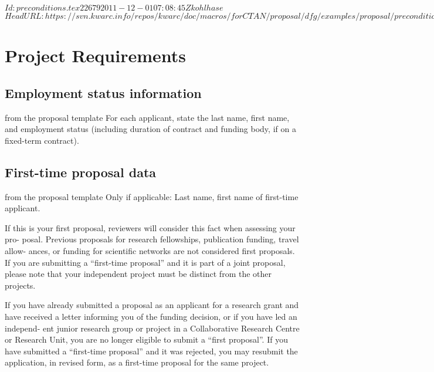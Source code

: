 \svnInfo $Id: preconditions.tex 22679 2011-12-01 07:08:45Z kohlhase $
\svnKeyword $HeadURL: https://svn.kwarc.info/repos/kwarc/doc/macros/forCTAN/proposal/dfg/examples/proposal/preconditions.tex $
\section{Project Requirements }

\subsection{Employment status information }

\begin{todo}{from the proposal template}
  For each applicant, state the last name, first name, and employment status (including
  duration of contract and funding body, if on a fixed-term contract).
\end{todo}

\subsection{First-time proposal data }

\begin{todo}{from the proposal template}
  Only if applicable: Last name, first name of first-time applicant.

  If this is your first proposal, reviewers will consider this fact when assessing your
  pro- posal. Previous proposals for research fellowships, publication funding, travel
  allow- ances, or funding for scientific networks are not considered first proposals. If
  you are submitting a “first-time proposal” and it is part of a joint proposal, please
  note that your independent project must be distinct from the other projects.

  If you have already submitted a proposal as an applicant for a research grant and have
  received a letter informing you of the funding decision, or if you have led an independ-
  ent junior research group or project in a Collaborative Research Centre or Research
  Unit, you are no longer eligible to submit a “first proposal”. If you have submitted a
  “first-time proposal” and it was rejected, you may resubmit the application, in revised
  form, as a first-time proposal for the same project.
\end{todo}

